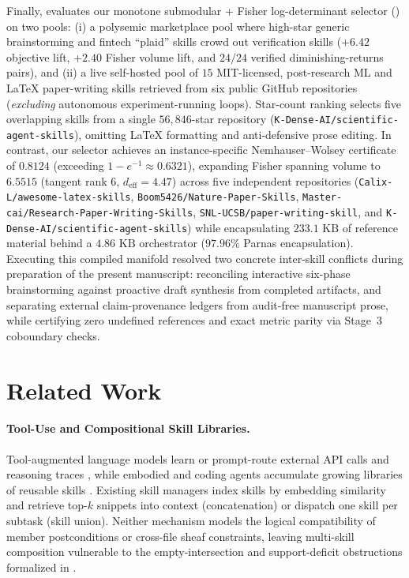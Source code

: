 \documentclass[11pt]{article}
\theoremstyle{definition}
\theoremstyle{plain}
\begin{document}
Finally,  evaluates our monotone submodular + Fisher log-determinant selector () on two pools: (i) a polysemic marketplace pool where high-star generic brainstorming and fintech ``plaid'' skills crowd out verification skills ($+6.42$ objective lift, $+2.40$ Fisher volume lift, and $24/24$ verified diminishing-returns pairs), and (ii) a live self-hosted pool of $15$ MIT-licensed, post-research ML and LaTeX paper-writing skills retrieved from six public GitHub repositories (\emph{excluding} autonomous experiment-running loops). Star-count ranking selects five overlapping skills from a single $56{,}846$-star repository (\nolinkurl{K-Dense-AI/scientific-agent-skills}), omitting LaTeX formatting and anti-defensive prose editing. In contrast, our selector achieves an instance-specific Nemhauser--Wolsey certificate of $0.8124$ (exceeding $1 - e^{-1} \approx 0.6321$), expanding Fisher spanning volume to $6.5515$ (tangent rank $6$, $d_{\mathrm{eff}} = 4.47$) across five independent repositories (\nolinkurl{Calix-L/awesome-latex-skills}, \nolinkurl{Boom5426/Nature-Paper-Skills}, \nolinkurl{Master-cai/Research-Paper-Writing-Skills}, \nolinkurl{SNL-UCSB/paper-writing-skill}, and \nolinkurl{K-Dense-AI/scientific-agent-skills}) while encapsulating $233.1\text{ KB}$ of reference material behind a $4.86\text{ KB}$ orchestrator ($97.96\%$ Parnas encapsulation). Executing this compiled manifold resolved two concrete inter-skill conflicts during preparation of the present manuscript: reconciling interactive six-phase brainstorming against proactive draft synthesis from completed artifacts, and separating external claim-provenance ledgers from audit-free manuscript prose, while certifying zero undefined references and exact metric parity via Stage~3 coboundary checks.

\section{Related Work}
\label{sec:related}

\paragraph{Tool-Use and Compositional Skill Libraries.}
Tool-augmented language models learn or prompt-route external API calls and reasoning traces \citep{schick2023toolformer,yao2023react}, while embodied and coding agents accumulate growing libraries of reusable skills \citep{wang2024voyager}. Existing skill managers index skills by embedding similarity and retrieve top-$k$ snippets into context (concatenation) or dispatch one skill per subtask (skill union). Neither mechanism models the logical compatibility of member postconditions or cross-file sheaf constraints, leaving multi-skill composition vulnerable to the empty-intersection and support-deficit obstructions formalized in .
\end{document}

